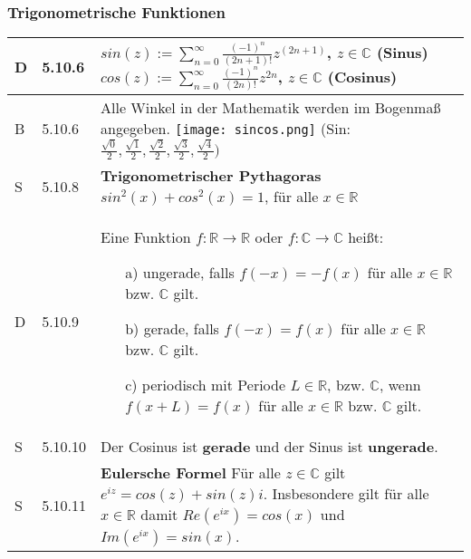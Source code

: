 \subsubsection{Trigonometrische Funktionen}

    \begin{longtable}{p{0.75cm} p{1cm} p{16cm}}
        \toprule

        D   & 5.10.6&   $sin(z) := \sum^{\infty}_{n=0} \frac{(-1)^n}{(2n+1)!} z^(2n+1)$, $z \in \mathbb{C}$ (\textbf{Sinus}) \hfill \break
                        $cos(z) := \sum^{\infty}_{n=0} \frac{(-1)^n}{(2n)!}z^{2n}$, $z \in \mathbb{C}$ (\textbf{Cosinus}) \\
        \midrule
        B   & 5.10.6 &  Alle Winkel in der Mathematik werden im Bogenmaß angegeben. \hfill \break
                        \texttt{[image: sincos.png]} \hfill \break
                        (Sin: $\frac{\sqrt{0}}{2},\frac{\sqrt{1}}{2},\frac{\sqrt{2}}{2},\frac{\sqrt{3}}{2},\frac{\sqrt{4}}{2})$\\
        \midrule
        S   & 5.10.8&   \textbf{Trigonometrischer Pythagoras}\hfill \break
                        $sin^2(x) + cos^2(x) = 1$, für alle $x \in \mathbb{R}$ \\
        \midrule
        D   & 5.10.9&   Eine Funktion $f: \mathbb{R} \rightarrow \mathbb{R}$ oder $f: \mathbb{C} \rightarrow \mathbb{C}$ heißt: 
                        \begin{itemize}[topsep=-0.5cm]
                            \item[a)] ungerade, falls $f(-x) = -f(x)$ für alle $x \in \mathbb{R}$ bzw. $\mathbb{C}$ gilt.
                            \item[b)] gerade, falls $f(-x) = f(x)$ für alle $x \in \mathbb{R}$ bzw. $\mathbb{C}$ gilt.
                            \item[c)] periodisch mit Periode $L \in \mathbb{R}$, bzw. $\mathbb{C}$, wenn $f(x+L) = f(x)$ für alle $x \in \mathbb{R}$ bzw. $\mathbb{C}$ gilt.
                        \end{itemize} \vspace{-0cm}\\
        \midrule
        S   & 5.10.10&  Der Cosinus ist \textbf{gerade} und der Sinus ist \textbf{ungerade}. \\
        \midrule
        S   & 5.10.11&  \textbf{Eulersche Formel} \hfill \break
                        Für alle $z \in \mathbb{C}$ gilt $e^{iz} = cos(z)+sin(z)i$. \hfill \break
                        Insbesondere gilt für alle $x \in \mathbb{R}$ damit $Re(e^{ix}) = cos(x)$ und $Im(e^{ix})=sin(x)$. \\

\end{longtable}
